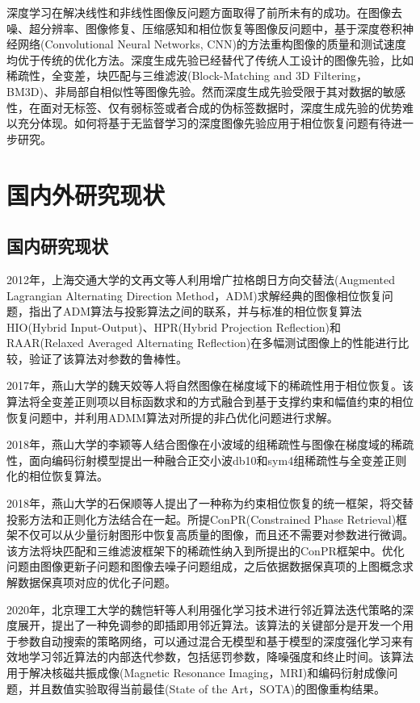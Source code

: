 深度学习在解决线性和非线性图像反问题方面取得了前所未有的成功\supercite{Ulyanov,Ulyanov,Mataev}。在图像去噪、超分辨率、图像修复、压缩感知和相位恢复等图像反问题中，基于深度卷积神经网络(Convolutional Neural Networks, CNN)的方法重构图像的质量和测试速度均优于传统的优化方法。深度生成先验已经替代了传统人工设计的图像先验，比如稀疏性，全变差，块匹配与三维滤波(Block-Matching and 3D Filtering，BM3D)、非局部自相似性等图像先验。然而深度生成先验受限于其对数据的敏感性，在面对无标签、仅有弱标签或者合成的伪标签数据时，深度生成先验的优势难以充分体现。如何将基于无监督学习的深度图像先验应用于相位恢复问题有待进一步研究。

\section{国内外研究现状}

\subsection{国内研究现状}
2012年，上海交通大学的文再文等人利用增广拉格朗日方向交替法(Augmented Lagrangian Alternating Direction Method，ADM)求解经典的图像相位恢复问题，指出了ADM算法与投影算法之间的联系，并与标准的相位恢复算法HIO(Hybrid Input-Output)、HPR(Hybrid Projection Reflection)和RAAR(Relaxed Averaged Alternating Reflection)在多幅测试图像上的性能进行比较，验证了该算法对参数的鲁棒性。

2017年，燕山大学的魏天姣等人将自然图像在梯度域下的稀疏性用于相位恢复。该算法将全变差正则项以目标函数求和的方式融合到基于支撑约束和幅值约束的相位恢复问题中，并利用ADMM算法对所提的非凸优化问题进行求解。

2018年，燕山大学的李颖等人结合图像在小波域的组稀疏性与图像在梯度域的稀疏性，面向编码衍射模型提出一种融合正交小波db10和sym4组稀疏性与全变差正则化的相位恢复算法\supercite{LiYin}。

2018年，燕山大学的石保顺等人提出了一种称为约束相位恢复的统一框架，将交替投影方法和正则化方法结合在一起。所提ConPR(Constrained Phase Retrieval)框架不仅可以从少量衍射图形中恢复高质量的图像，而且还不需要对参数进行微调。该方法将块匹配和三维滤波框架下的稀疏性纳入到所提出的ConPR框架中。优化问题由图像更新子问题和图像去噪子问题组成，之后依据数据保真项的上图概念求解数据保真项对应的优化子问题\supercite{Baoshun}。

2020年，北京理工大学的魏恺轩等人利用强化学习技术进行邻近算法迭代策略的深度展开，提出了一种免调参的即插即用邻近算法。该算法的关键部分是开发一个用于参数自动搜索的策略网络，可以通过混合无模型和基于模型的深度强化学习来有效地学习邻近算法的内部迭代参数，包括惩罚参数，降噪强度和终止时间。该算法用于解决核磁共振成像(Magnetic Resonance Imaging，MRI)和编码衍射成像问题，并且数值实验取得当前最佳(State of the Art，SOTA)的图像重构结果\supercite{Kaixuan}。

